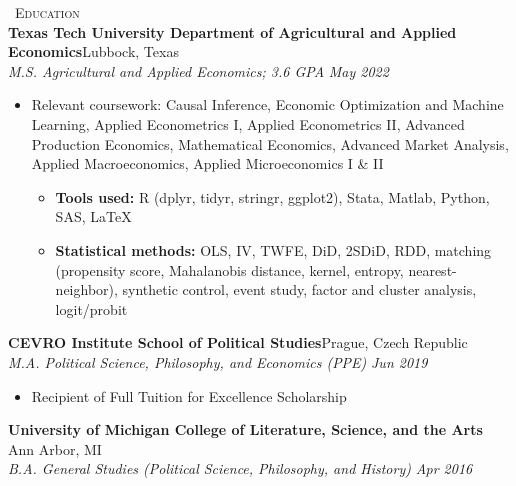 \documentclass[a4paper,11pt]{article}
\newcommand{\header} [1] {
    \vspace{1mm}
    {\textsc{\large{\xrfill[0.5ex]{0.5pt}~#1~\xrfill[0.5ex]{0.5pt}}}} %
}
\begin{document}

\header{Education} \\
\vspace{1mm}
\textbf{Texas Tech University Department of Agricultural and Applied Economics}\hfill Lubbock, Texas\\
\textit{M.S. Agricultural and Applied Economics; 3.6 GPA} \hfill  \emph{May 2022} \\
\begin{itemize}
    \item Relevant coursework: Causal Inference, Economic Optimization and Machine Learning, Applied Econometrics I, Applied Econometrics II, Advanced Production Economics, Mathematical Economics, Advanced Market Analysis, Applied Macroeconomics, Applied Microeconomics I \& II
    \begin{itemize}
        \item \textbf{Tools used:} R (dplyr, tidyr, stringr, ggplot2), Stata, Matlab, Python, SAS, \LaTeX
        \item \textbf{Statistical methods:} OLS, IV, TWFE, DiD, 2SDiD, RDD, matching (propensity score, Mahalanobis distance, kernel, entropy, nearest-neighbor), synthetic control, event study, factor and cluster analysis, logit/probit
    \end{itemize}
\end{itemize}
\vspace{1mm}

\textbf{CEVRO Institute School of Political Studies}\hfill Prague, Czech Republic\\
\textit{M.A. Political Science, Philosophy, and Economics (PPE)} \hfill  \emph{Jun 2019}\\
\begin{itemize}
    \item Recipient of Full Tuition for Excellence Scholarship
\end{itemize}
\vspace{1mm}

\textbf{University of Michigan College of Literature, Science, and the Arts} \hfill Ann Arbor, MI\\
\textit{B.A. General Studies (Political Science, Philosophy, and History)} \hfill  \emph{Apr 2016}\\

\vspace{1mm}
\end{document}
